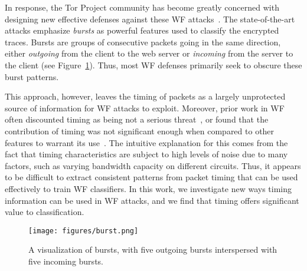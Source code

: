 \documentclass[USenglish,oneside,twocolumn]{article}
\begin{document}
In response, the Tor Project community has become greatly concerned with designing new effective defenses against these WF attacks~\cite{perry2011experimental, perry2013critique}. The state-of-the-art attacks emphasize {\em bursts} as powerful features used to classify the encrypted traces. Bursts are groups of consecutive packets going in the same direction, either \emph{outgoing} from the client to the web server or \emph{incoming} from the server to the client (see Figure~\ref{burst}). Thus, most WF defenses primarily seek to obscure these burst patterns. 

This approach, however, leaves the timing of packets as a largely unprotected source of information for WF attacks to exploit. Moreover, prior work in WF often discounted timing as being not a serious threat~\cite{wang2017walkie}, or found that the contribution of timing was not significant enough when compared to other features to warrant its use~\cite{hayes2016k}. The intuitive explanation for this comes from the fact that timing characteristics are subject to high levels of noise due to many factors, such as varying bandwidth capacity on different circuits. Thus, it appears to be difficult to extract consistent patterns from packet timing that can be used effectively to train WF classifiers. In this work, we investigate new ways timing information can be used in WF attacks, and we find that timing offers significant value to classification.


\begin{figure}[t!]
    \centering
    \texttt{[image: figures/burst.png]}
    \caption{A visualization of bursts, with five outgoing bursts               interspersed with five incoming bursts.}
    \label{burst}
    \vspace{-0.5cm}
\end{figure}
\end{document}
